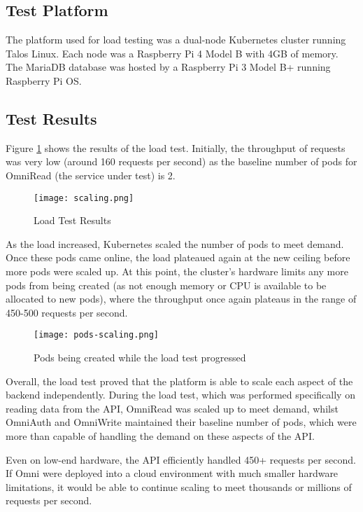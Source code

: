 \subsection{Test Platform}
The platform used for load testing was a dual-node Kubernetes cluster running Talos Linux.
Each node was a Raspberry Pi 4 Model B with 4GB of memory. The MariaDB database was hosted by a Raspberry Pi 3 Model B+ running Raspberry Pi OS.

\subsection{Test Results}
Figure \ref{fig:load-test-results} shows the results of the load test. Initially, the throughput of requests was very low (around 160 requests per second) as the baseline number of pods for OmniRead (the service under test) is 2.

\begin{figure}[htbp]
\texttt{[image: scaling.png]}
\centering
\caption{Load Test Results}
\label{fig:load-test-results}
\end{figure}

As the load increased, Kubernetes scaled the number of pods to meet demand. Once these pods came online, the load plateaued again at the new ceiling before more pods were scaled up.
At this point, the cluster's hardware limits any more pods from being created (as not enough memory or CPU is available to be allocated to new pods), where the throughput once again plateaus in the range of 450-500 requests per second. 

\begin{figure}[htbp]
\texttt{[image: pods-scaling.png]}
\centering
\caption{Pods being created while the load test progressed}
\label{fig:load-test-pods-scaling}
\end{figure}

Overall, the load test proved that the platform is able to scale each aspect of the backend independently.
During the load test, which was performed specifically on reading data from the API, OmniRead was scaled up to meet demand, whilst OmniAuth and OmniWrite maintained their baseline number of pods, which were more than capable of handling the demand on these aspects of the API. 

Even on low-end hardware, the API efficiently handled 450+ requests per second.
If Omni were deployed into a cloud environment with much smaller hardware limitations, it would be able to continue scaling to meet thousands or millions of requests per second.
